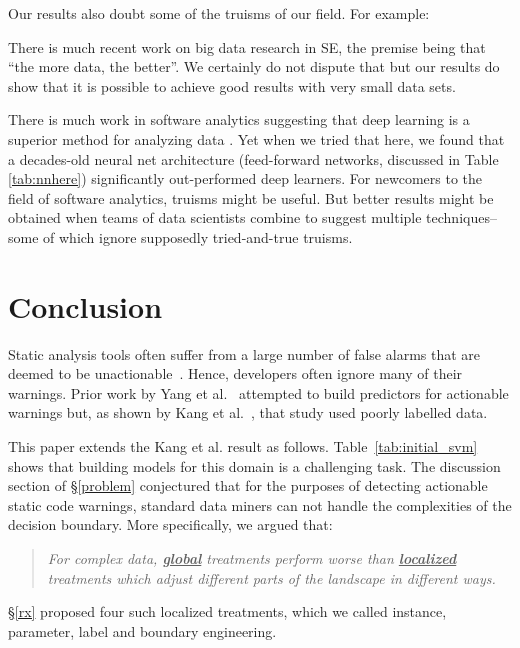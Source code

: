 Our results also  doubt some of the truisms of our field. 
For example:
\bi
\item There is much recent work on big data research in SE, the premise being that ``the more data, the better''. We certainly do not dispute that but
our  results do show that it is possible to achieve good results with very small data sets.
\item
There is much work in software analytics suggesting that  deep learning is a superior method for analyzing data \cite{yedida2021value, wang2018deep, li2017cclearner, white2015deep}. Yet when we tried that here, we found that a decades-old neural net architecture (feed-forward networks, discussed in Table \ref{tab:nnhere}) significantly out-performed deep learners. 
\ei
For newcomers to the field of software analytics,
truisms   might be useful. But better results
might be obtained when teams of data scientists
combine to suggest  multiple techniques-- some of which ignore supposedly tried-and-true truisms.
  
 
  
  
\section{Conclusion}
\label{sec:conclusion}

Static analysis tools often
suffer from a large number of false alarms that are deemed
to be unactionable~\cite{tomassi2021real}. Hence, developers often ignore
many of their warnings. Prior work by 
Yang et al.~\cite{yang2021learning} attempted to build predictors for
actionable warnings but,
as shown by Kang et al.~\cite{kang2022detecting}, that study used
poorly labelled data. 

This paper extends the  Kang et al. result as follows.
 Table~\ref{tab:initial_svm} shows that building
 models for this domain is a challenging task. 
 The discussion section of \S\ref{problem}
 conjectured that for the purposes of detecting
 actionable static code warnings, standard
 data miners can not handle the complexities of
 the   decision boundary. More specifically, 
 we argued that:
 \begin{quote}
 {\em 
 For complex data, \underline{\bf global} treatments  
   perform worse  than \underline{\bf localized} treatments
 which   adjust different parts of the  landscape in 
 different ways.}
 \end{quote}
 \S\ref{rx} proposed four such localized treatments, 
 which we called instance, parameter, label and boundary engineering.
 
